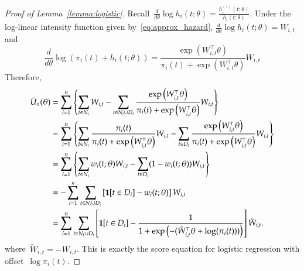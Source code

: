 \documentclass[12pt]{amsart}
\begin{document}
\begin{proof}[Proof of Lemma~\ref{lemma:logistic}]
Recall~$\frac{d}{d\theta} \log h_i (t; \theta) = \frac{h^{(1)}_i (t;
  \theta)}{h_i (t; \theta)}$. Under the log-linear
intensity function given by~\eqref{eq:approx_hazard},
$\frac{d}{d\theta} \log h_i (t; \theta) = W_{i,t}$ and 
\[
\frac{d}{d \theta} \log \left( \pi_i (t) + h_i (t;\theta) \right) = 
\frac{\exp \left( W_{i,t}^\top \theta \right)}{\pi_i (t) + \exp
  \left( W_{i,t}^\top \theta \right)} W_{i,t}
\]
Therefore,
\begin{align*}
\tilde U_n (\theta) 
  &= \sum_{i=1}^n \left \{ \sum_{t \in N_i} W_{i,t} -
    \sum_{t \in N_i \cup D_i} \frac{\exp \left( W_{i,t}^\top \theta
    \right)}{\pi_i (t) + \exp \left( W_{i,t}^\top \theta \right)}
    W_{i,t} \right \} \\
  &= \sum_{i=1}^n \left \{ \sum_{t \in N_i} \frac{\pi_i (t)}{\pi_i (t)
    + \exp \left( W_{i,t}^\top \theta \right)} W_{i,t} -
    \sum_{t \in D_i} \frac{\exp \left( W_{i,t}^\top \theta
    \right)}{\pi_i (t) + \exp \left( W_{i,t}^\top \theta \right)}
    W_{i,t} \right \} \\
  &= \sum_{i=1}^n \left \{ \sum_{t \in N_i} w_{i} (t; \theta) W_{i,t} -
    \sum_{t \in D_i} (1 - w_i (t; \theta)) W_{i,t} \right \} \\
  &= - \sum_{i=1}^n \sum_{t \in N_i \cup D_i} \left[ {\bf 1} [t \in
    D_i]  - w_{i} (t; \theta) \right] W_{i,t} \\
  &= \sum_{i=1}^n \sum_{t \in N_i \cup D_i}
    \left[ {\bf 1} [t \in D_i]  - \frac{1}{1 + \exp\left( - (
          \tilde W_{i,t}^\top \theta + \log (\pi_i (t) ) ) \right)}
    \right] \tilde W_{i,t}.
\end{align*}
where~$\tilde W_{i,t} = - W_{i,t}$. This is exactly the score equation
for logistic regression with offset~$\log \pi_i (t)$.
\end{proof}
\end{document}
